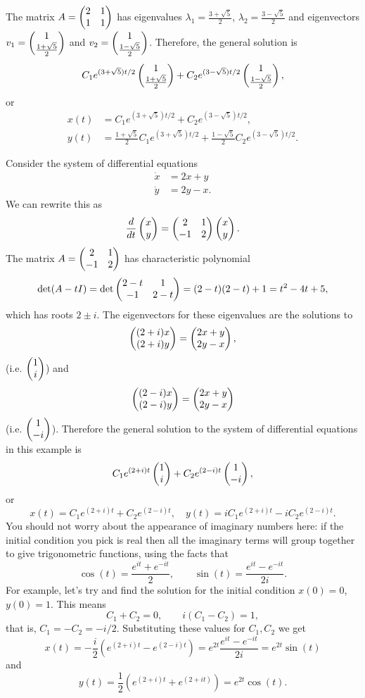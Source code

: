 \documentclass{article}
\begin{document}
\begin{Example}
The matrix \(A=\begin{pmatrix} 2 & 1 \\ 1 & 1 \end{pmatrix}\) has eigenvalues
\(\lambda_1=\frac{3+\sqrt{5}}{2}\),
\(\lambda_2=\frac{3-\sqrt{5}}{2}\) and eigenvectors \(v_1=\begin{pmatrix}
1\\ \frac{1+\sqrt{5}}{2}\end{pmatrix}\) and \(v_2=\begin{pmatrix} 1
\\ \frac{1-\sqrt{5}}{2}\end{pmatrix}\). Therefore, the general solution is
\[C_1e^{(3+\sqrt{5})t/2}\begin{pmatrix}
1\\ \frac{1+\sqrt{5}}{2}\end{pmatrix}+C_2e^{(3-\sqrt{5})t/2}\begin{pmatrix} 1
\\ \frac{1-\sqrt{5}}{2}\end{pmatrix},\] or
\begin{align*}
x(t)&=C_1e^{(3+\sqrt{5})t/2}+C_2e^{(3-\sqrt{5})t/2},\\
y(t)&=\frac{1+\sqrt{5}}{2}C_1e^{(3+\sqrt{5})t/2}+\frac{1-\sqrt{5}}{2}C_2e^{(3-\sqrt{5})t/2}.
\end{align*}


\end{Example}
\begin{Example}
Consider the system of differential equations
\begin{align*}
\dot{x}&=2x+y\\
\dot{y}&=2y-x.
\end{align*}
We can rewrite this as \[\frac{d}{dt}\begin{pmatrix} x \\ y \end{pmatrix}=\begin{pmatrix} 2 & 1\\ -1 &
2\end{pmatrix}\begin{pmatrix} x \\ y \end{pmatrix}.\] The matrix \(A=\begin{pmatrix} 2 & 1 \\ -1 & 2 \end{pmatrix}\) has
characteristic polynomial \[\det(A-tI)=\det\begin{pmatrix} 2-t & 1 \\ -1 &
2-t\end{pmatrix}=(2-t)(2-t)+1=t^2-4t+5,\] which has roots \(2\pm i\). The
eigenvectors for these eigenvalues are the solutions to \[\begin{pmatrix} (2+i)x
\\ (2+i)y\end{pmatrix}=\begin{pmatrix} 2x+y\\2y-x\end{pmatrix},\] (i.e. \(\begin{pmatrix} 1 \\ i\end{pmatrix}\)) and \[\begin{pmatrix}
(2-i)x \\ (2-i)y\end{pmatrix}=\begin{pmatrix} 2x+y\\2y-x\end{pmatrix}\] (i.e. \(\begin{pmatrix} 1
\\ -i\end{pmatrix}\)). Therefore the general solution to the system of
differential equations in this example is \[C_1e^{(2+i)t}\begin{pmatrix} 1 \\ i
\end{pmatrix}+C_2e^{(2-i)t}\begin{pmatrix} 1 \\ -i\end{pmatrix},\] or
\[x(t)=C_1e^{(2+i)t}+C_2e^{(2-i)t},\quad
y(t)=iC_1e^{(2+i)t}-iC_2e^{(2-i)t}.\] You should not worry about the
appearance of imaginary numbers here: if the initial condition you
pick is real then all the imaginary terms will group together to
give trigonometric functions, using the facts that
\[\cos(t)=\frac{e^{it}+e^{-it}}{2},\qquad\sin(t)=\frac{e^{it}-e^{-it}}{2i}.\]
For example, let's try and find the solution for the initial
condition \(x(0)=0\), \(y(0)=1\). This means \[C_1+C_2=0,\qquad
i(C_1-C_2)=1,\] that is, \(C_1=-C_2=-i/2\). Substituting these
values for \(C_1,C_2\) we get
\[x(t)=-\frac{i}{2}(e^{(2+i)t}-e^{(2-i)t})=e^{2t}\frac{e^{it}-e^{-it}}{2i}=e^{2t}\sin(t)\]
and \[y(t)=\frac{1}{2}(e^{(2+i)t}+e^{(2+it)})=e^{2t}\cos(t).\]


\end{Example}
\end{document}
